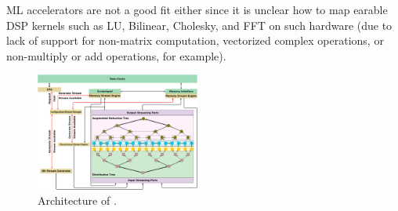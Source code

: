 ML accelerators are not a good fit either
since it is unclear how to map earable DSP kernels such as LU, Bilinear, Cholesky, and FFT on such hardware (due to lack of
support for non-matrix computation, vectorized complex operations, or non-multiply or add
operations, for example). 

\begin{figure}[h]
  \centering
  \includegraphics[width=0.48\textwidth]{arch.png}
  \caption{
  \small
  Architecture of \arch{}.}
  \label{fig:arch}
\end{figure}

